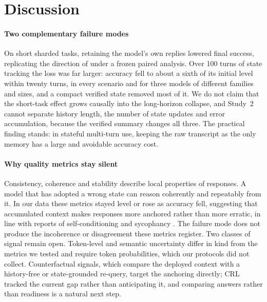 \section{Discussion}
\label{sec:discussion}

\paragraph{Two complementary failure modes}
On short sharded tasks, retaining the model's own replies lowered final
success, replicating the direction of \citet{huang2026benefit} under a frozen
paired analysis. Over 100 turns of state tracking the loss was far larger:
accuracy fell to about a sixth of its initial level within twenty turns, in
every scenario and for three models of different families and sizes, and a
compact verified state removed most of it. We do not claim that the short-task
effect grows causally into the long-horizon collapse, and Study~2 cannot
separate history length, the number of state updates and error accumulation,
because the verified summary changes all three. The practical finding stands:
in stateful multi-turn use, keeping the raw transcript as the only memory has a
large and avoidable accuracy cost.

\paragraph{Why quality metrics stay silent}
Consistency, coherence and stability describe local properties of responses. A
model that has adopted a wrong state can reason coherently and repeatably from
it. In our data these metrics stayed level or rose as accuracy fell, suggesting
that accumulated context makes responses more anchored rather than more
erratic, in line with reports of self-conditioning and sycophancy
\citep{sinha2025illusion,sharma2024sycophancy}. The failure mode does not
produce the incoherence or disagreement these metrics register. Two classes of
signal remain open. Token-level and semantic uncertainty
\citep{khalid2025ergo,farquhar2024detecting} differ in kind from the metrics we
tested and require token probabilities, which our protocols did not collect.
Counterfactual signals, which compare the deployed context with a history-free
or state-grounded re-query, target the anchoring directly; CRL tracked the
current gap rather than anticipating it, and comparing answers rather than
readiness is a natural next step.

